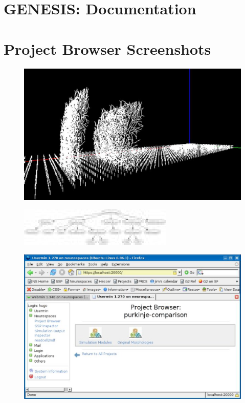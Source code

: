 \documentclass[12pt]{article}
\begin{document}
\section*{GENESIS: Documentation}

\section*{Project Browser Screenshots}

\begin{figure}[h]
  \centering
 \includegraphics[scale=0.6]{figs/screenshot-1.eps}
  \label{fig:pb-1}
\end{figure}

\begin{figure}[h]
  \centering
 \includegraphics[scale=0.6]{figs/screenshot-2.eps}
  \label{fig:pb-1}
\end{figure}

\begin{figure}[h]
  \centering
 \includegraphics[scale=0.6]{figs/screenshot-3.eps}
  \label{fig:pb-1}
\end{figure}
\end{document}
